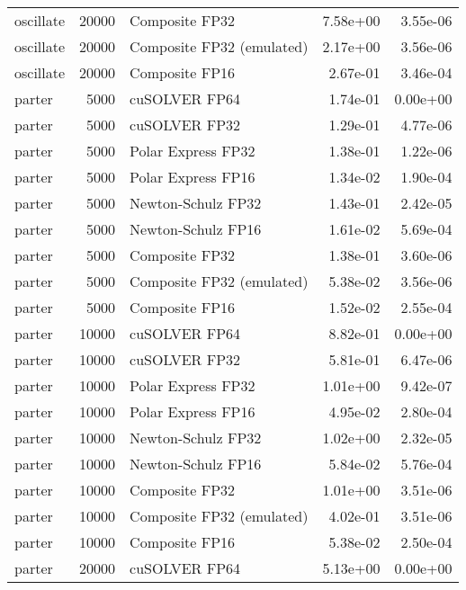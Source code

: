 \begin{table}
\begin{tabular}{lrlrr}
oscillate & 20000 &            Composite FP32 &  7.58e+00 &        3.55e-06 \\
oscillate & 20000 & Composite FP32 (emulated) &  2.17e+00 &        3.56e-06 \\
oscillate & 20000 &            Composite FP16 &  2.67e-01 &        3.46e-04 \\
   parter &  5000 &             cuSOLVER FP64 &  1.74e-01 &        0.00e+00 \\
   parter &  5000 &             cuSOLVER FP32 &  1.29e-01 &        4.77e-06 \\
   parter &  5000 &        Polar Express FP32 &  1.38e-01 &        1.22e-06 \\
   parter &  5000 &        Polar Express FP16 &  1.34e-02 &        1.90e-04 \\
   parter &  5000 &        Newton-Schulz FP32 &  1.43e-01 &        2.42e-05 \\
   parter &  5000 &        Newton-Schulz FP16 &  1.61e-02 &        5.69e-04 \\
   parter &  5000 &            Composite FP32 &  1.38e-01 &        3.60e-06 \\
   parter &  5000 & Composite FP32 (emulated) &  5.38e-02 &        3.56e-06 \\
   parter &  5000 &            Composite FP16 &  1.52e-02 &        2.55e-04 \\
   parter & 10000 &             cuSOLVER FP64 &  8.82e-01 &        0.00e+00 \\
   parter & 10000 &             cuSOLVER FP32 &  5.81e-01 &        6.47e-06 \\
   parter & 10000 &        Polar Express FP32 &  1.01e+00 &        9.42e-07 \\
   parter & 10000 &        Polar Express FP16 &  4.95e-02 &        2.80e-04 \\
   parter & 10000 &        Newton-Schulz FP32 &  1.02e+00 &        2.32e-05 \\
   parter & 10000 &        Newton-Schulz FP16 &  5.84e-02 &        5.76e-04 \\
   parter & 10000 &            Composite FP32 &  1.01e+00 &        3.51e-06 \\
   parter & 10000 & Composite FP32 (emulated) &  4.02e-01 &        3.51e-06 \\
   parter & 10000 &            Composite FP16 &  5.38e-02 &        2.50e-04 \\
   parter & 20000 &             cuSOLVER FP64 &  5.13e+00 &        0.00e+00 \\

\end{tabular}
\end{table}
